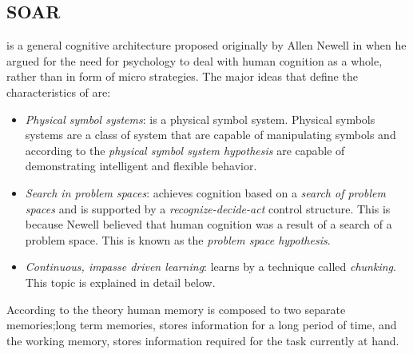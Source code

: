 
\subsection{SOAR}

\soar is a general cognitive architecture proposed originally by Allen
Newell in \cite{Newell:1990aa,27702} when he argued for the need for
psychology to deal with human cognition as a whole, rather than in
form of micro strategies. The major ideas\cite{Lewis:2001aa} that
define the characteristics of \soar are:

\begin{itemize}
\item \emph{Physical symbol systems}: \soar is a physical symbol
  system. Physical symbols systems are a class of system that are
  capable of manipulating symbols and according to the \emph{physical
    symbol system hypothesis}\cite{Newell1980135} are capable of
  demonstrating intelligent and flexible behavior.
\item \emph{Search in problem spaces}: \soar achieves cognition based
  on a \emph{search of problem spaces} and is supported by a
  \emph{recognize-decide-act} control structure. This is because
  Newell believed that human cognition was a result of a search of a
  problem space. This is known as the \emph{problem space
    hypothesis}\cite{162585}. 
\item \emph{Continuous, impasse driven learning}: \soar learns by
  a technique called \emph{chunking}. This topic is explained in
  detail below.


\end{itemize}

According to the \soar theory human memory is composed to two separate
memories;long term memories, stores information for a long period of
time, and the working memory, stores information required for the task
currently at hand. 


